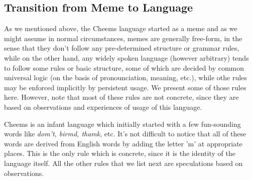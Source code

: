 \documentclass{article}
\begin{document}
\subsection{Transition from Meme to Language}
As we mentioned above, the Cheems language started as a meme and as we might assume in normal circumstances, memes are generally free-form, in the sense that they don't follow any pre-determined structure or grammar rules, while on the other hand, any widely spoken language (however arbitrary) tends to follow some rules or basic structure, some of which are decided by common universal logic (on the basis of pronounciation, meaning, etc.), while othe rules may be enforced implicitly by persistent usage. We present some of those rules here. However, note that most of these rules are not concrete, since they are based on observations and experiences of usage of this language.\par
Cheems is an infant language which initially started with a few fun-sounding words like \textit{dom't, birmd, thamk}, etc. It's not difficult to notice that all of these words are derived from English words by adding the letter 'm' at appropriate places. This is the only rule which is concrete, since it is the identity of the language itself. All the other rules that we list next are speculations based on observations.
\end{document}
